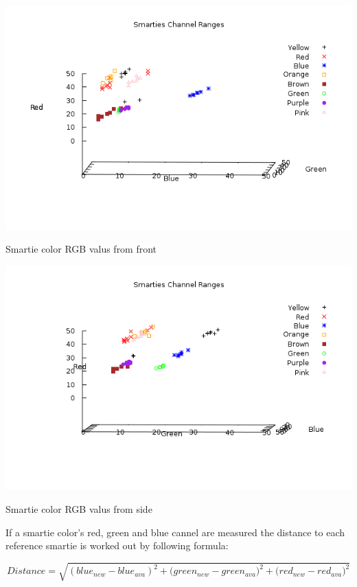  \begin{Image}
\begin{center}
\includegraphics[width=\textwidth]{plot_front.png}\caption{Smartie color RGB valus from front}
\end{center}
\end{Image}
 \begin{Image}
\begin{center}
\includegraphics[width=\textwidth]{plot_side.png}\caption{Smartie color RGB valus from side}
\end{center}
\end{Image}


If a smartie color's red, green and blue cannel are measured the distance to each reference smartie is worked out by following formula:

\[ Distance = \sqrt{ ( {blue_{new} - blue_{ava} } )^2 + { (green_{new} - green_{ava} })^2 + { ( red_{new} - red_{ava} })^2 } \]

